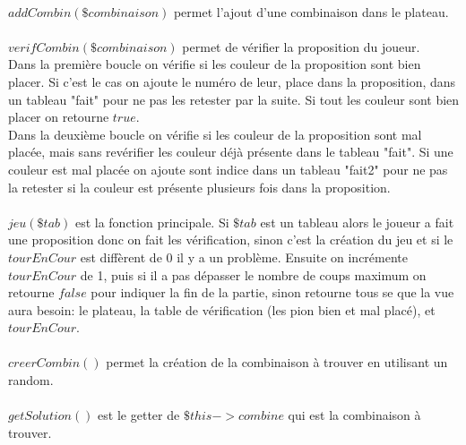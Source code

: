 \documentclass{article}
\begin{document}
            \paragraph{}
            $addCombin(\$combinaison)$ permet l'ajout d'une combinaison dans le plateau.
            
            \paragraph{}
            $verifCombin(\$combinaison)$ permet de vérifier la proposition du joueur.\\
            Dans la première boucle on vérifie si les couleur de la proposition sont bien placer. Si c'est le cas on ajoute le numéro de leur, place dans la proposition, dans un tableau "fait" pour ne pas les retester par la suite. Si tout les couleur sont bien placer on retourne $true$.\\
            Dans la deuxième boucle on vérifie si les couleur de la proposition sont mal placée, mais sans revérifier les couleur déjà présente dans le tableau "fait".
            Si une couleur est mal placée on ajoute sont indice dans un tableau "fait2" pour ne pas la retester si la couleur est présente plusieurs fois dans la proposition.
            
            \paragraph{}
            $jeu(\$tab)$ est la fonction principale. Si $\$tab$ est un tableau alors le joueur a fait une proposition donc on fait les vérification, sinon c'est la création du jeu et si le $tourEnCour$ est diffèrent de 0 il y a un problème. Ensuite on incrémente $tourEnCour$ de 1, puis si il a pas dépasser le nombre de coups maximum on retourne $false$ pour indiquer la fin de la partie, sinon retourne tous se que la vue aura besoin: le plateau, la table de vérification (les pion bien et mal placé), et $tourEnCour$.
            
            \paragraph{}
            $creerCombin()$ permet la création de la combinaison à trouver en utilisant un random.
            
            \paragraph{}
            $getSolution()$ est le getter de $\$this->combine$ qui est la combinaison à trouver.
            
\end{document}
